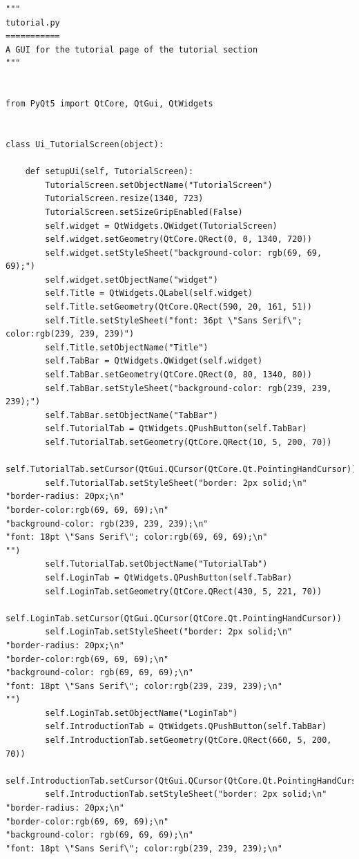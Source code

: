 \documentclass{article}
\begin{document}
\begin{lstlisting}
"""
tutorial.py
===========
A GUI for the tutorial page of the tutorial section
"""


from PyQt5 import QtCore, QtGui, QtWidgets


class Ui_TutorialScreen(object):

    def setupUi(self, TutorialScreen):
        TutorialScreen.setObjectName("TutorialScreen")
        TutorialScreen.resize(1340, 723)
        TutorialScreen.setSizeGripEnabled(False)
        self.widget = QtWidgets.QWidget(TutorialScreen)
        self.widget.setGeometry(QtCore.QRect(0, 0, 1340, 720))
        self.widget.setStyleSheet("background-color: rgb(69, 69, 69);")
        self.widget.setObjectName("widget")
        self.Title = QtWidgets.QLabel(self.widget)
        self.Title.setGeometry(QtCore.QRect(590, 20, 161, 51))
        self.Title.setStyleSheet("font: 36pt \"Sans Serif\"; color:rgb(239, 239, 239)")
        self.Title.setObjectName("Title")
        self.TabBar = QtWidgets.QWidget(self.widget)
        self.TabBar.setGeometry(QtCore.QRect(0, 80, 1340, 80))
        self.TabBar.setStyleSheet("background-color: rgb(239, 239, 239);")
        self.TabBar.setObjectName("TabBar")
        self.TutorialTab = QtWidgets.QPushButton(self.TabBar)
        self.TutorialTab.setGeometry(QtCore.QRect(10, 5, 200, 70))
        self.TutorialTab.setCursor(QtGui.QCursor(QtCore.Qt.PointingHandCursor))
        self.TutorialTab.setStyleSheet("border: 2px solid;\n"
"border-radius: 20px;\n"
"border-color:rgb(69, 69, 69);\n"
"background-color: rgb(239, 239, 239);\n"
"font: 18pt \"Sans Serif\"; color:rgb(69, 69, 69);\n"
"")
        self.TutorialTab.setObjectName("TutorialTab")
        self.LoginTab = QtWidgets.QPushButton(self.TabBar)
        self.LoginTab.setGeometry(QtCore.QRect(430, 5, 221, 70))
        self.LoginTab.setCursor(QtGui.QCursor(QtCore.Qt.PointingHandCursor))
        self.LoginTab.setStyleSheet("border: 2px solid;\n"
"border-radius: 20px;\n"
"border-color:rgb(69, 69, 69);\n"
"background-color: rgb(69, 69, 69);\n"
"font: 18pt \"Sans Serif\"; color:rgb(239, 239, 239);\n"
"")
        self.LoginTab.setObjectName("LoginTab")
        self.IntroductionTab = QtWidgets.QPushButton(self.TabBar)
        self.IntroductionTab.setGeometry(QtCore.QRect(660, 5, 200, 70))
        self.IntroductionTab.setCursor(QtGui.QCursor(QtCore.Qt.PointingHandCursor))
        self.IntroductionTab.setStyleSheet("border: 2px solid;\n"
"border-radius: 20px;\n"
"border-color:rgb(69, 69, 69);\n"
"background-color: rgb(69, 69, 69);\n"
"font: 18pt \"Sans Serif\"; color:rgb(239, 239, 239);\n"

\end{lstlisting}
\end{document}
